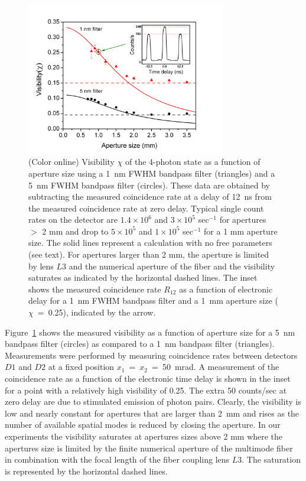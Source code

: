 \begin{figure}[tbp]
\centering \includegraphics[width=87mm]{Fig4.png}
\caption{(Color online) Visibility $\chi$ of the 4-photon state as a function of aperture size using a 1~nm FWHM bandpass filter (triangles) and a 5~nm FWHM bandpass filter (circles). These data are obtained by subtracting the measured coincidence rate at a delay of 12~ns from the measured coincidence rate at zero delay. Typical single count rates on the detector are $1.4\times10^6$ and $3\times10^5$ sec$^{-1}$ for apertures $>$ 2 mm and drop to $5\times10^5$ and $1\times10^5$ sec$^{-1}$ for a 1 mm aperture size. The solid lines represent a calculation with no free parameters (see text). For apertures larger than 2 mm, the aperture is limited by lens $L3$ and the numerical aperture of the fiber and the visibility saturates as indicated by the horizontal dashed lines. The inset shows the measured coincidence rate $R_{12}$ as a function of electronic delay for a 1~nm FWHM bandpass filter and a 1~mm aperture size ($\chi$~=~0.25), indicated by the arrow.}\label{Fig:Visibility}
\end{figure}

Figure~\ref{Fig:Visibility} shows the measured visibility as a function of aperture size for a 5~nm bandpass filter (circles) as compared to a 1~nm bandpass filter (triangles). Measurements were performed by measuring coincidence rates between detectors $D1$ and $D2$ at a fixed position $x_1$~=~$x_2$~=~50~mrad. A measurement of the coincidence rate as a function of the electronic time delay is shown in the inset for a point with a relatively high visibility of 0.25. The extra 50 counts/sec at zero delay are due to stimulated emission of photon pairs. Clearly, the visibility is low and nearly constant for apertures that are larger than 2~mm and rises as the number of available spatial modes is reduced by closing the aperture. In our experiments the visibility saturates at apertures sizes above 2 mm where the apertures size is limited by the finite numerical aperture of the multimode fiber in combination with the focal length of the fiber coupling lens $L3$. The saturation is represented by the horizontal dashed lines.

